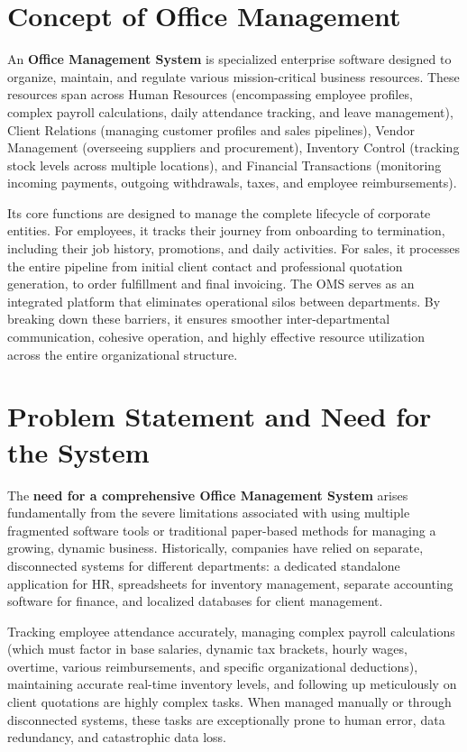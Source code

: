 ﻿\documentclass[12pt,a4paper]{report}
\begin{document}
\section*{Concept of Office Management}
An \textbf{Office Management System} is specialized enterprise software designed to organize, maintain, and regulate various mission-critical business resources. These resources span across Human Resources (encompassing employee profiles, complex payroll calculations, daily attendance tracking, and leave management), Client Relations (managing customer profiles and sales pipelines), Vendor Management (overseeing suppliers and procurement), Inventory Control (tracking stock levels across multiple locations), and Financial Transactions (monitoring incoming payments, outgoing withdrawals, taxes, and employee reimbursements). 

Its core functions are designed to manage the complete lifecycle of corporate entities. For employees, it tracks their journey from onboarding to termination, including their job history, promotions, and daily activities. For sales, it processes the entire pipeline from initial client contact and professional quotation generation, to order fulfillment and final invoicing. The OMS serves as an integrated platform that eliminates operational silos between departments. By breaking down these barriers, it ensures smoother inter-departmental communication, cohesive operation, and highly effective resource utilization across the entire organizational structure.

\section*{Problem Statement and Need for the System}
The \textbf{need for a comprehensive Office Management System} arises fundamentally from the severe limitations associated with using multiple fragmented software tools or traditional paper-based methods for managing a growing, dynamic business. Historically, companies have relied on separate, disconnected systems for different departments: a dedicated standalone application for HR, spreadsheets for inventory management, separate accounting software for finance, and localized databases for client management. 

Tracking employee attendance accurately, managing complex payroll calculations (which must factor in base salaries, dynamic tax brackets, hourly wages, overtime, various reimbursements, and specific organizational deductions), maintaining accurate real-time inventory levels, and following up meticulously on client quotations are highly complex tasks. When managed manually or through disconnected systems, these tasks are exceptionally prone to human error, data redundancy, and catastrophic data loss. 
\end{document}
